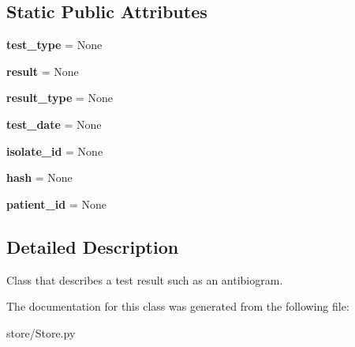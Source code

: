 \subsection*{Static Public Attributes}
\begin{DoxyCompactItemize}
\item 
\hypertarget{classstore_1_1_store_1_1_result_a1f79dd282c1a466c756a81fd5dc6a4c2}{{\bfseries test\-\_\-type} = None}\label{classstore_1_1_store_1_1_result_a1f79dd282c1a466c756a81fd5dc6a4c2}

\item 
\hypertarget{classstore_1_1_store_1_1_result_a95b08efeba19e328bfa909ac27ee44c9}{{\bfseries result} = None}\label{classstore_1_1_store_1_1_result_a95b08efeba19e328bfa909ac27ee44c9}

\item 
\hypertarget{classstore_1_1_store_1_1_result_a3f42ca76b24b92b2f23dee79ca7b4b8f}{{\bfseries result\-\_\-type} = None}\label{classstore_1_1_store_1_1_result_a3f42ca76b24b92b2f23dee79ca7b4b8f}

\item 
\hypertarget{classstore_1_1_store_1_1_result_a77ef210d749a37d02140fbac6ed88326}{{\bfseries test\-\_\-date} = None}\label{classstore_1_1_store_1_1_result_a77ef210d749a37d02140fbac6ed88326}

\item 
\hypertarget{classstore_1_1_store_1_1_result_aa55b328d0989fa4b16dd8e17af62ba7f}{{\bfseries isolate\-\_\-id} = None}\label{classstore_1_1_store_1_1_result_aa55b328d0989fa4b16dd8e17af62ba7f}

\item 
\hypertarget{classstore_1_1_store_1_1_result_ac751733772ce5ca268b2c7e7f7171d3c}{{\bfseries hash} = None}\label{classstore_1_1_store_1_1_result_ac751733772ce5ca268b2c7e7f7171d3c}

\item 
\hypertarget{classstore_1_1_store_1_1_result_a9ed220790e77b3f948eab69ca35a8ac9}{{\bfseries patient\-\_\-id} = None}\label{classstore_1_1_store_1_1_result_a9ed220790e77b3f948eab69ca35a8ac9}

\end{DoxyCompactItemize}


\subsection{Detailed Description}
Class that describes a test result such as an antibiogram. 

The documentation for this class was generated from the following file\-:\begin{DoxyCompactItemize}
\item 
store/Store.\-py\end{DoxyCompactItemize}
